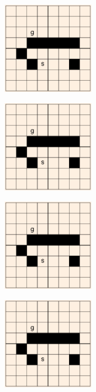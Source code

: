 \documentclass[9pt,a4paper]{extarticle}
\begin{document}
\begin{enumerate}
\begin{enumerate}[label*=\alph*)]
  \end{enumerate}

\end{enumerate}

    \begin{figure}[!ht]
      \centering
      \includegraphics[width=0.35\textwidth]{grid.png}
    \end{figure}
    
    \begin{figure}[!ht]
      \centering
      \includegraphics[width=0.35\textwidth]{grid.png}
    \end{figure}

        \begin{figure}[!ht]
      \centering
      \includegraphics[width=0.35\textwidth]{grid.png}
    \end{figure}

        \begin{figure}[!ht]
      \centering
      \includegraphics[width=0.35\textwidth]{grid.png}
    \end{figure}
\end{document}
